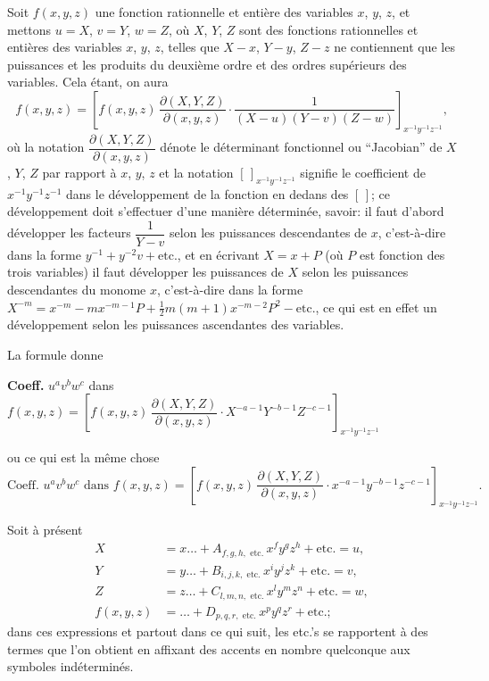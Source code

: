 \documentclass[11pt,a4paper]{book}
\begin{document}
Soit $f(x,y,z)$ une fonction rationnelle et enti\`{e}re des variables $x$, $y$, $z$, et mettons $u=X$, $v=Y$, $w=Z$, o\`{u} $X$, $Y$, $Z$ sont des fonctions rationnelles et enti\`{e}res des variables $x$, $y$, $z$, telles que $X-x$, $Y-y$, $Z-z$ ne contiennent que les puissances et les produits du deuxi\`{e}me ordre et des ordres sup\'{e}rieurs des variables. Cela \'{e}tant, on aura
\[
f(x,y,z)=[f(x,y,z)\,\frac{\partial(X,Y,Z)}{\partial(x,y,z)}\cdot\frac{1}{(X-u)(Y-v)(Z-w)}]_{x^{-1}y^{-1}z^{-1}},
\]
o\`{u} la notation $\dfrac{\partial(X,Y,Z)}{\partial(x,y,z)}$ d\'{e}note le d\'{e}terminant fonctionnel ou ``Jacobian'' de $X$, $Y$, $Z$ par rapport \`{a} $x$, $y$, $z$ et la notation $[\,]_{x^{-1}y^{-1}z^{-1}}$ signifie le coefficient de $x^{-1}y^{-1}z^{-1}$ dans le d\'{e}veloppement de la fonction en dedans des $[\,]$; ce d\'{e}veloppement doit s'effectuer d'une mani\`{e}re d\'{e}termin\'{e}e, savoir: il faut d'abord d\'{e}velopper les facteurs $\dfrac{1}{Y-v}$ selon les puissances descendantes de $x$, c'est-\`{a}-dire dans la forme $y^{-1}+y^{-2}v+\text{etc.}$, et en \'{e}crivant $X=x+P$ (o\`{u} $P$ est fonction des trois variables) il faut d\'{e}velopper les puissances de $X$ selon les puissances descendantes du monome $x$, c'est-\`{a}-dire dans la forme $X^{-m}=x^{-m}-mx^{-m-1}P+\tfrac{1}{2}m(m+1)x^{-m-2}P^2-\text{etc.}$, ce qui est en effet un d\'{e}veloppement selon les puissances ascendantes des variables.

La formule donne

\textbf{Coeff.} $u^av^bw^c$ dans $f(x,y,z)=[f(x,y,z)\,\dfrac{\partial(X,Y,Z)}{\partial(x,y,z)}\cdot X^{-a-1}Y^{-b-1}Z^{-c-1}]_{x^{-1}y^{-1}z^{-1}}$

ou ce qui est la m\^{e}me chose
\[
\text{Coeff. }u^av^bw^c\text{ dans }f(x,y,z)=[f(x,y,z)\,\frac{\partial(X,Y,Z)}{\partial(x,y,z)}\cdot x^{-a-1}y^{-b-1}z^{-c-1}]_{x^{-1}y^{-1}z^{-1}}.
\]

Soit \`{a} pr\'{e}sent
\begin{align*}
X &= x\ldots+A_{f,g,h,\text{ etc.}}\,x^fy^gz^h+\text{etc.}=u,\\
Y &= y\ldots+B_{i,j,k,\text{ etc.}}\,x^iy^jz^k+\text{etc.}=v,\\
Z &= z\ldots+C_{l,m,n,\text{ etc.}}\,x^ly^mz^n+\text{etc.}=w,\\
f(x,y,z) &= \ldots+D_{p,q,r,\text{ etc.}}\,x^py^qz^r+\text{etc.};
\end{align*}
dans ces expressions et partout dans ce qui suit, les etc.'s se rapportent \`{a} des termes que l'on obtient en affixant des accents en nombre quelconque aux symboles ind\'{e}termin\'{e}s.
\end{document}
